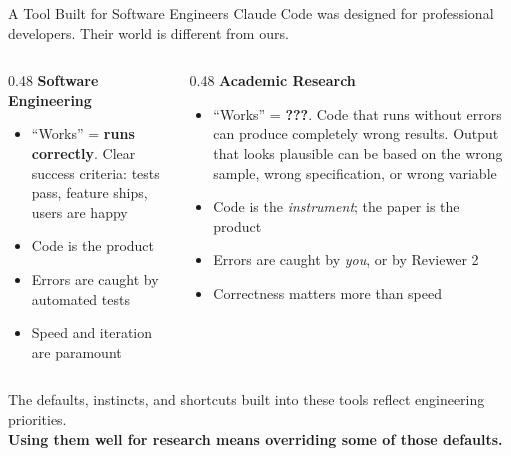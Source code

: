 \documentclass[aspectratio=169, 11pt]{beamer}
\begin{document}
\begin{frame}{A Tool Built for Software Engineers}
  Claude Code was designed for professional developers. Their world is different from ours.

  \vspace{0.5em}
  \begin{columns}[T]
    \begin{column}{0.48\textwidth}
      \textbf{Software Engineering}
      \begin{itemize}
        \item ``Works'' = \textbf{runs correctly}. Clear success criteria: tests pass, feature ships, users are happy
        \item Code is the product
        \item Errors are caught by automated tests
        \item Speed and iteration are paramount
      \end{itemize}
    \end{column}
    \begin{column}{0.48\textwidth}
      \textbf{Academic Research}
      \begin{itemize}
        \item ``Works'' = \textbf{???}. Code that runs without errors can produce completely wrong results. Output that looks plausible can be based on the wrong sample, wrong specification, or wrong variable
        \item Code is the \textit{instrument}; the paper is the product
        \item Errors are caught by \textit{you}, or by Reviewer 2
        \item Correctness matters more than speed
      \end{itemize}
    \end{column}
  \end{columns}

  \vspace{0.5em}
  The defaults, instincts, and shortcuts built into these tools reflect engineering priorities.\\
  \textbf{Using them well for research means overriding some of those defaults.}
\end{frame}
\end{document}
